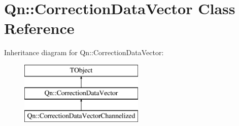 \hypertarget{classQn_1_1CorrectionDataVector}{}\section{Qn\+:\+:Correction\+Data\+Vector Class Reference}
\label{classQn_1_1CorrectionDataVector}
Inheritance diagram for Qn\+:\+:Correction\+Data\+Vector\+:\begin{figure}[H]
\begin{center}
\leavevmode
\includegraphics[height=3.000000cm]{classQn_1_1CorrectionDataVector}
\end{center}
\end{figure}
